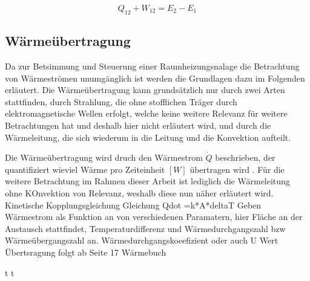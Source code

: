 \begin{equation}
\label{eq:hauptsatz}
Q_{12} + W_{12} = E_2 - E_1
\end{equation}


\subsection{Wärmeübertragung}
Da zur Betsimmung und Steuerung einer Raumheizungsnalage die Betrachtung von Wärmeströmen unumgänglich ist werden die Grundlagen dazu im Folgenden erläutert.
Die Wärmeübertragung kann grundsätzlich nur durch zwei Arten stattfinden, durch Strahlung, die ohne stofflichen Träger durch elektromagnetische Wellen erfolgt, welche keine weitere Relevanz für weitere Betrachtungen hat und deshalb hier nicht erläutert wird, und durch die Wärmeleitung, die sich wiederum in die Leitung und die Konvektion aufteilt. \cite[S.~3f.]{bo14}

Die Wärmeübertragung wird druch den Wärmestrom $\dot{Q}$ beschrieben, der quantifiziert wieviel Wärme pro Zeiteinheit $[W]$ übertragen wird \cite[S.~5]{bo14}.
Für die weitere Betrachtung im Rahmen dieser Arbeit ist lediglich die Wärmeleitung ohne KOnvektion von Relevanz, weshalb diese nun näher erläutert wird.
Kinetische Kopplungsgleichung\cite[S.~7]{bo14}
Gleichung Qdot =k*A*deltaT
Geben Wärmestrom als Funktion an von verschiedenen Paramatern, hier Fläche an der Austausch stattfindet, Temperaturdifferenz und Wärmedurchgangszahl bzw Wärmeübergangszahl an.
Wärmedurchgangskoeefizient oder auch U Wert
Übertsragung folgt ab Seite 17 Wärmebuch

t 
\newpage
t 
\newpage